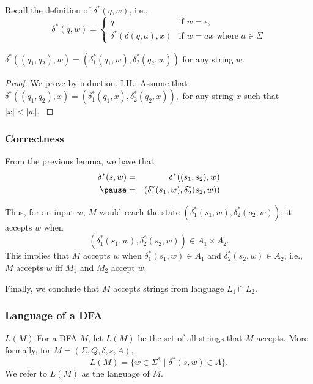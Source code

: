 \begin{frame}

  {\small
    Recall the definition of $\delta^*(q,w)$, i.e., \pause
    \[
    \delta^*(q,w) = \left\{
    \begin{array}{ll}
      q & \mbox{if $w=\epsilon$,} \\
      \delta^*(\delta(q,a),x) & \mbox{if $w=ax$ where $a\in\Sigma$}
    \end{array}
    \right.
    \]
  }
  \pause
  \begin{lemma}
    $\delta^*((q_1,q_2),w) = (\delta_1^*(q_1,w),\delta_2^*(q_2,w))$
    for any string $w$.
  \end{lemma}

  \begin{proof}
    {\small
      We prove by induction.  I.H.: Assume that
      $
      \delta^*((q_1,q_2),x) = (\delta_1^*(q_1,x),\delta_2^*(q_2,x)),
      $
      for any string $x$ such that $|x|<|w|$.
    }
    \vspace{1.2in}
    
  \end{proof}
  
\end{frame}

\begin{frame}

  \frametitle{Correctness}

  From the previous lemma, we have that
  \begin{eqnarray*}
    \delta^*(s,w) &=& \delta^*((s_1,s_2),w) \\ \pause
    &=& (\delta_1^*(s_1,w),\delta_2^*(s_2,w))
  \end{eqnarray*}

  \pause

  Thus, for an input $w$, $M$ would reach the state
  $(\delta_1^*(s_1,w),\delta_2^*(s_2,w))$; it accepts $w$ when
  \[
  (\delta_1^*(s_1,w),\delta_2^*(s_2,w))\in A_1\times A_2.
  \]
  This implies that $M$ accepts $w$ when $\delta_1^*(s_1,w)\in A_1$
  and $\delta_2^*(s_2,w)\in A_2$, i.e., $M$ accepts $w$ iff $M_1$ and
  $M_2$ accept $w$.

  Finally, we conclude that $M$ accepts strings from language $L_1\cap
  L_2$.
  
\end{frame}

\begin{frame}
  \frametitle{Language of a DFA}

  \begin{block}{$L(M)$}
    For a DFA $M$, let $L(M)$ be the set of all strings that $M$
    accepts.  More formally, for $M=(\Sigma,Q,\delta,s,A)$,
    \[
    L(M)=\{w\in\Sigma^* \;|\; \delta^*(s,w)\in A\}.
    \]
    We refer to $L(M)$ as the language of $M$.
  \end{block}
  
\end{frame}

